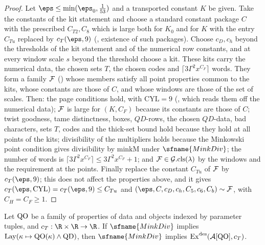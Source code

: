 \begin{proof}
Let $\eps\le\min(\eps_0,\frac1{53})$ and a transported constant $K$ be given. Take the constants of the kit statement and
choose a standard constant package $C$ with the prescribed $C_{T2},C_8$ which is large both for $K_0$ and for $K$ with the
entry $C_{Tu}$ replaced by $c_T(\eps,9)$ (, existence of such packages).
Choose $c_D,c_h$ beyond the thresholds of the kit statement and of the numerical row constants, and at every window
scale $s$ beyond the threshold choose a kit. These kits carry the numerical data, the chosen sets $T$, the chosen codes and
$\lceil3\Gamma^2x^{C_F}\rceil$ words. They form a family $\mathcal{F}$ ()
whose members satisfy all point properties common to the kits, whose constants are those of $C$, and whose windows
are those of the set of scales. Then: the page conditions hold, with $\mathrm{CYL}=9$
(, which reads them off the numerical data); $\mathcal{F}$ is large for
$(K,C_F)$ because its constants are those of $C$; twist goodness, tame distinctness, boxes, $QD$-rows, the chosen $QD$-data,
bad characters, sets $T$, codes and the thick-set bound hold because they hold at all points of the kits; divisibility of
the multipliers holds because the Minkowski point condition gives divisibility by $\mathrm{minkM}$ under $\sfname{MinkDiv}$;
the number of words is $\lceil3\Gamma^2x^{C_F}\rceil\le3\Gamma^2x^{C_F}+1$; and $\mathcal{F}\in\mathcal G.\mathrm{cls}(\lambda)$ by
the windows and the requirement at the points. Finally replace the constant $C_{Tu}$ of $\mathcal{F}$ by $c_T(\eps,9)$; this does
not affect the properties above, and it gives $c_T(\eps,\mathrm{CYL})=c_T(\eps,9)\le C_{Tu}$ and
$(\eps,C,c_D,c_h,C_5,c_6,C_b)\sim\stageUFm$, with $C_H=C_F\ge1$.
\end{proof}

\begin{proposition}\label{pf:stageU:recs}
Let $\mathrm{QO}$ be a family of properties of data and objects indexed by parameter tuples, and $c_T:\R\times\R\to\R$. If
$\sfname{MinkDiv}$ implies $\mathrm{Lay}(\kappa\mapsto\mathrm{QO}(\kappa)\wedge\mathrm{QD})$, then $\sfname{MinkDiv}$ implies
$\mathrm{Ex}^{\mathrm{des}}(\mathcal{A}[\mathrm{QO}],c_T)$.
\end{proposition}

